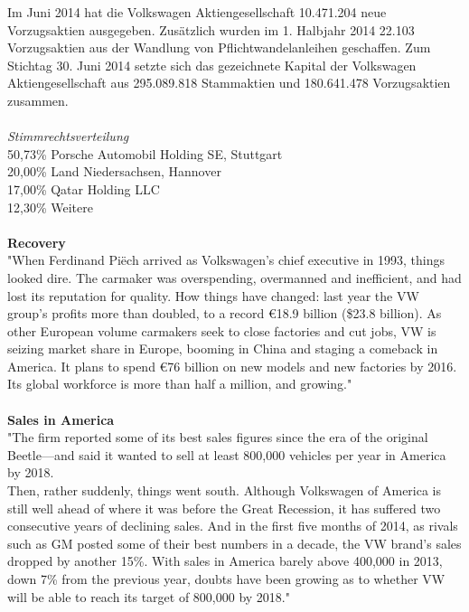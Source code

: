 \documentclass[12pt]{article}
\begin{document}
Im Juni 2014 hat die Volkswagen Aktiengesellschaft 10.471.204 neue Vorzugsaktien ausgegeben. Zusätzlich wurden im 1. Halbjahr 2014 22.103 Vorzugsaktien aus der Wandlung von Pflichtwandelanleihen geschaffen. Zum Stichtag 30. Juni 2014 setzte sich das gezeichnete Kapital der Volkswagen Aktiengesellschaft aus 295.089.818 Stammaktien und 180.641.478 Vorzugsaktien zusammen.
\cite{aktionaersstruktur} \\ \\
\textit{Stimmrechtsverteilung} \\
50,73\% Porsche Automobil Holding SE, Stuttgart\\
20,00\% Land Niedersachsen, Hannover\\
17,00\% Qatar Holding LLC\\
12,30\% Weitere
\\ \\
\textbf{Recovery}\\
"When Ferdinand Piëch arrived as Volkswagen's chief executive in 1993, things looked dire. The carmaker was overspending, overmanned and inefficient, and had lost its reputation for quality. How things have changed: last year the VW group's profits more than doubled, to a record €18.9 billion (\$23.8 billion). As other European volume carmakers seek to close factories and cut jobs, VW is seizing market share in Europe, booming in China and staging a comeback in America. It plans to spend €76 billion on new models and new factories by 2016. Its global workforce is more than half a million, and growing."\cite{ec2}
\\ \\
\textbf{Sales in America} \\
"The firm reported some of its best sales figures since the era of the original Beetle—and said it wanted to sell at least 800,000 vehicles per year in America by 2018.\\
Then, rather suddenly, things went south. Although Volkswagen of America is still well ahead of where it was before the Great Recession, it has suffered two consecutive years of declining sales. And in the first five months of 2014, as rivals such as GM posted some of their best numbers in a decade, the VW brand’s sales dropped by another 15\%. With sales in America barely above 400,000 in 2013, down 7\% from the previous year, doubts have been growing as to whether VW will be able to reach its target of 800,000 by 2018." \cite{ec1}
\end{document}
